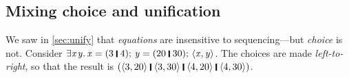\documentclass[acmsmall,review,dvipsnames]{acmart}
\newcommand{\Varid}[1]{\mathit{#1}}
\begin{document}
\subsection{Mixing choice and unification} \label{sec:mixing}

We saw in \cref{sec:unify} that \emph{equations} are insensitive to sequencing---but \emph{choice} is not.
Consider
\ensuremath{\exists\Varid{x}\hspace{0.3mm}\Varid{y}.\,\Varid{x}\mathrel{=}(\mathrm{3}\;\rule[-0.3mm]{0.5mm}{2.5mm}\;\mathrm{4});\,\Varid{y}\mathrel{=}(\mathrm{20}\;\rule[-0.3mm]{0.5mm}{2.5mm}\;\mathrm{30});\,\langle{}\Varid{x},\Varid{y}\rangle}.  The choices are made \emph{left-to-right}, so that the result is
\ensuremath{(\langle{}\mathrm{3},\mathrm{20}\rangle\;\rule[-0.3mm]{0.5mm}{2.5mm}\;\langle{}\mathrm{3},\mathrm{30}\rangle\;\rule[-0.3mm]{0.5mm}{2.5mm}\;\langle{}\mathrm{4},\mathrm{20}\rangle\;\rule[-0.3mm]{0.5mm}{2.5mm}\;\langle{}\mathrm{4},\mathrm{30}\rangle)}.
\end{document}

